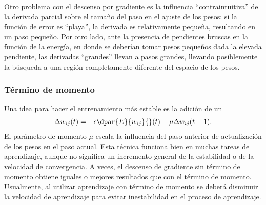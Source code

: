 Otro problema con el descenso por gradiente es la influencia
``contraintuitiva'' de la derivada parcial sobre el tamaño del paso en
el ajuste de los pesos: si la función de error es ``playa'', la
derivada es relativamente pequeña, resultando en un paso pequeño.  Por
otro lado, ante la presencia de pendientes bruscas en la función de
la energía, en donde se deberían tomar pesos pequeños dada la
elevada pendiente, las derivadas ``grandes'' llevan a pasos grandes,
llevando posiblemente la búsqueda a una región completamente diferente
del espacio de los pesos.

\subsubsection{Término de momento}

Una idea para hacer el entrenamiento más estable es la adición de un
%
\begin{align}\label{mlp8}
  \Delta w_{ij}(t) = - \epsilon \dpar{E}{w_{ij}}{}(t)
    + \mu \Delta w_{ij}(t-1).
\end{align}
%
El parámetro de momento $\mu$ escala la influencia del paso anterior
de actualización de los pesos en el paso actual. Esta técnica funciona
bien en muchas tareas de aprendizaje, aunque no significa un
incremento general de la estabilidad o de la velocidad de
convergencia.  A veces, el descenso de gradiente sin término de
momento obtiene iguales o mejores resultados que con el término de
momento. Usualmente, al utilizar aprendizaje con término de momento se
deberá disminuir la velocidad de aprendizaje para evitar inestabilidad
en el proceso de aprendizaje.


